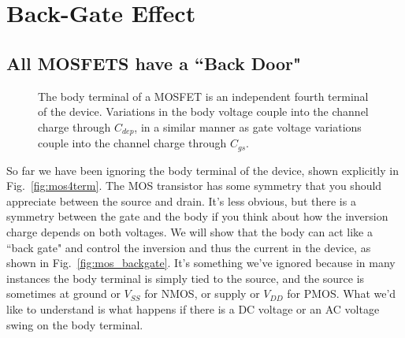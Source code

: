 \section{Back-Gate Effect}
\subsection{All MOSFETS have a ``Back Door"}
\begin{figure}[b]
\begin{center}
\end{center}
\caption{The body terminal of a MOSFET is an independent fourth terminal of the device.  Variations in the body voltage couple into the channel charge through $C_{dep}$, in a similar manner as gate voltage variations couple into the channel charge through $C_{gs}$. } 
\end{figure}

So far we have been ignoring the body terminal of the device, shown explicitly in Fig.~\ref{fig:mos4term}.  The MOS transistor has some symmetry that you should appreciate between the source and drain.  It's less obvious, but there is a symmetry between the gate and the body if you think about how the inversion charge depends on both voltages. We will show that the body can act like a ``back gate" and control the inversion and thus the current in the device, as shown in Fig.~\ref{fig:mos_backgate}.  It's something we've ignored because in many instances the body terminal is simply tied to the source, and the source is sometimes at ground or $V_{SS}$ for NMOS, or supply or $V_{DD}$ for PMOS.  What we'd like to understand is what happens if there is a DC voltage or an AC voltage swing on the body terminal.
